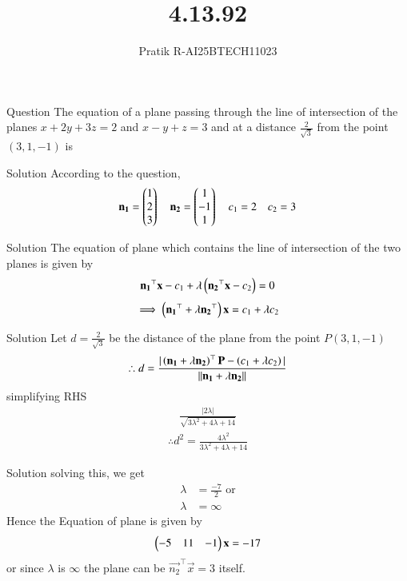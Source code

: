 \documentclass{beamer}
\title %
{4.13.92}
\author %
{Pratik R-AI25BTECH11023}
\begin{document}
\frame{\titlepage}
\begin{frame}{Question}
The equation of a plane passing through the line of intersection of the planes $x+2y+3z=2$ and $x-y + z = 3$ and at a distance $\frac{2}{\sqrt{3}}$ from the point $(3,1,-1)$ is 
\end{frame}
\begin{frame}{Solution}
According to the question,\\
\begin{align}
    \mathbf{n_1}=\begin{pmatrix}1\\2\\3\end{pmatrix} \quad \mathbf{n_2}=\begin{pmatrix}1\\-1\\1\end{pmatrix} \quad c_1=2 \quad c_2=3
\end{align}
\end{frame}
\begin{frame}{Solution}
The equation of plane which contains the line of intersection of the two planes is given by
\begin{align}
    \mathbf{n_1}^{\top}\mathbf{x}-c_1+\lambda\left(\mathbf{n_2}^{\top}\mathbf{x}-c_2\right)=0
\end{align}
\begin{align}
    \implies \left(\mathbf{n_1}^{\top}+\lambda\mathbf{n_2}^{\top}\right)\mathbf{x}=c_1+\lambda c_2
\end{align}
\end{frame}
\begin{frame}{Solution}
Let $d = \frac{2}{\sqrt{3}}$ be the distance of the plane from the point $P(3,1,-1)$ 
\begin{align}
    \therefore d = \frac{|\left(\mathbf{n_1}+\lambda\mathbf{n_2}\right)^{\top}\mathbf{P} - \left(c_1+\lambda c_2\right)|}{||\mathbf{n_1}+\lambda \mathbf{n_2}||}
\end{align}
simplifying RHS
\begin{align}
    \frac{|2\lambda|}{\sqrt{3\lambda ^2 +4\lambda +14}}
\end{align}
\begin{align}
    \therefore d^2= \frac{4\lambda ^2}{3\lambda ^2 +4\lambda +14}
\end{align}
\end{frame}
\begin{frame}{Solution}
solving this, we get
\begin{align}
   \lambda &=\frac{-7}{2} \text{ or}\\
   \lambda &= \infty
\end{align}
Hence the Equation of plane is given by
\begin{align}
    \begin{pmatrix}-5&11&-1\end{pmatrix}\mathbf{x}=-17
\end{align}
or since $\lambda$ is $\infty$ the plane can be $\vec{n_2}^{\top} \vec{x} = 3 $ itself.
\end{frame}
\end{document}
